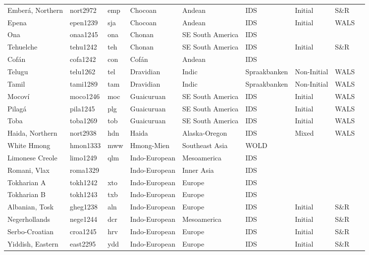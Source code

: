 \begin{longtable}{lllllllll}
  Emberá, Northern & nort2972 & emp & Chocoan & Andean & IDS & Initial & S\&R & \cite[13]{mortensen_northern-embera1999v2} \\ 
  Epena & epen1239 & sja & Chocoan & Andean & IDS & Initial & WALS &  \\ 
  Ona & onaa1245 & ona & Chonan & SE South America & IDS &  &  &  \\ 
  Tehuelche & tehu1242 & teh & Chonan & SE South America & IDS & Initial & S\&R & \cite[425]{garay_tehuelche1998.pdf} \\ 
  Cofán & cofa1242 & con & Cofán & Andean & IDS &  &  &  \\ 
  Telugu & telu1262 & tel & Dravidian & Indic & Spraakbanken & Non-Initial & WALS &  \\ 
  Tamil & tami1289 & tam & Dravidian & Indic & Spraakbanken & Non-Initial & WALS &  \\ 
  Mocoví & moco1246 & moc & Guaicuruan & SE South America & IDS & Initial & WALS &  \\ 
  Pilagá & pila1245 & plg & Guaicuruan & SE South America & IDS & Initial & WALS &  \\ 
  Toba & toba1269 & tob & Guaicuruan & SE South America & IDS & Initial & WALS &  \\ 
  Haida, Northern & nort2938 & hdn & Haida & Alaska-Oregon & IDS & Mixed & WALS &  \\ 
  White Hmong & hmon1333 & mww & Hmong-Mien & Southeast Asia & WOLD &  &  &  \\ 
  Limonese Creole & limo1249 & qlm & Indo-European & Mesoamerica & IDS &  &  &  \\ 
  Romani, Vlax & roma1329 &  & Indo-European & Inner Asia & IDS &  &  &  \\ 
  Tokharian A & tokh1242 & xto & Indo-European & Europe & IDS &  &  &  \\ 
  Tokharian B & tokh1243 & txb & Indo-European & Europe & IDS &  &  &  \\ 
  Albanian, Tosk & gheg1238 & aln & Indo-European & Europe & IDS & Initial & S\&R & \cite[275-278]{newmark_albanian1982.pdf}\cite[204]{kallulli_albanian2011.pdf} \\ 
  Negerhollands & nege1244 & dcr & Indo-European & Mesoamerica & IDS & Initial & S\&R & \cite[271]{vansluijs_negerhollands2013_o.pdf} \\ 
  Serbo-Croatian & croa1245 & hrv & Indo-European & Europe & IDS & Initial & S\&R & \cite[58]{browne-alt_serbo-croatian.pdf} \\ 
  Yiddish, Eastern & east2295 & ydd & Indo-European & Europe & IDS & Initial & S\&R & \cite[38]{zucker_yiddish1994.pdf} \\ 

\end{longtable}
